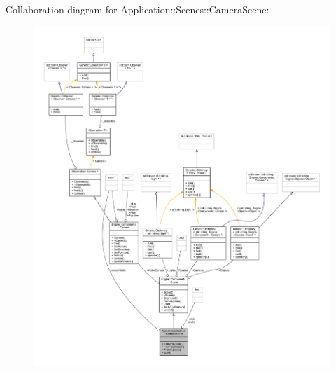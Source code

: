 Collaboration diagram for Application\+:\+:Scenes\+:\+:Camera\+Scene\+:
\nopagebreak
\begin{figure}[H]
\begin{center}
\leavevmode
\includegraphics[width=350pt]{classApplication_1_1Scenes_1_1CameraScene__coll__graph}
\end{center}
\end{figure}
